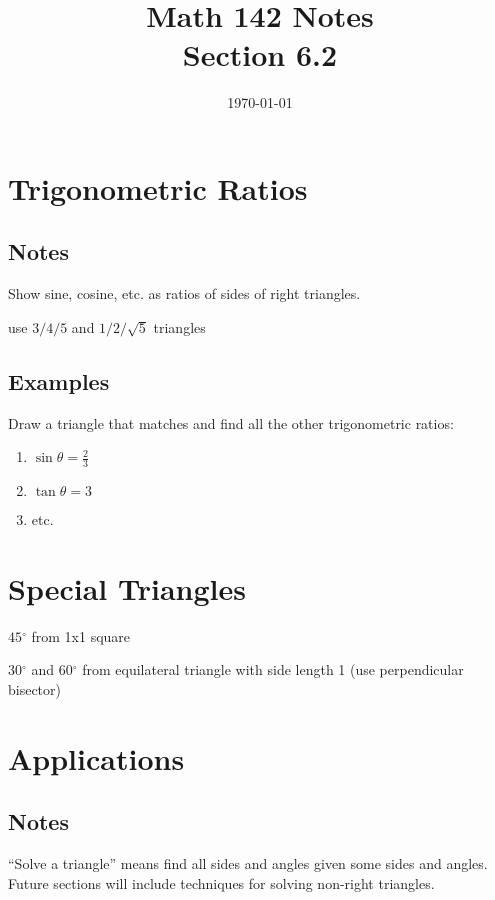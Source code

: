 \documentclass{exam}
\title{Math 142 Notes \\ Section 6.2}
\date{\today}
\newcommand{\dg}{\ensuremath{^\circ}}
\begin{document}
  \maketitle
  \tableofcontents

  \section{Trigonometric Ratios}

  \subsection{Notes}
  \begin{itemize*}
    \item Show sine, cosine, etc. as ratios of sides of right triangles.
    \item use $3/4/5$ and $1/2/\sqrt{5}$ triangles
  \end{itemize*}

  \subsection{Examples}
  Draw a triangle that matches and find all the other trigonometric ratios:
  \begin{enumerate}
    \item $\sin \theta = \frac{2}{3}$  
    \item $\tan \theta = 3$
    \item etc.
  \end{enumerate}

  \section{Special Triangles}

  \begin{itemize*}
    \item $45 \dg$ from 1x1 square 
    \item $30 \dg$ and $60 \dg$ from equilateral triangle with side length 1 (use perpendicular bisector)
  \end{itemize*}

  \section{Applications}

  \subsection{Notes}
  ``Solve a triangle'' means find all sides and angles given some sides and angles.  Future sections will include
  techniques for solving non-right triangles.
\end{document}
